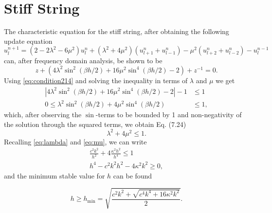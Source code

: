\documentclass{article}
\begin{document}
\section{Stiff String}
The characteristic equation for the stiff string, after obtaining the following update equation
\begin{equation}
    u_l^{n+1}=(2-2\lambda^2-6\mu^2)u_l^n+(\lambda^2+4\mu^2)(u_{l+1}^n+u_{l-1}^n)-\mu^2(u_{l+2}^n+u_{l-2}^n)-u_l^{n-1}
\end{equation}
can, after frequency domain analysis, be shown to be
\begin{equation}
    z + (4\lambda^2\sin^2(\beta h/2)+16\mu^2\sin^4(\beta h/2)-2) +z^{-1} = 0.
\end{equation}
Using \eqref{eq:condition214} and solving the inequality in terms of $\lambda$ and $\mu$ we get
\begin{equation}\label{eq:stiffStringInequality}
    \begin{aligned}
    |4\lambda^2\sin^2(\beta h/2)+16\mu^2\sin^4(\beta h/2)-2|-1&\leq 1\\
    0\leq\lambda^2\sin^2(\beta h/2)+4\mu^2\sin^4(\beta h/2)&\leq 1,
    \end{aligned}
\end{equation}
which, after observing the $\sin$-terms to be bounded by 1 and non-negativity of the solution through the squared terms, we obtain Eq. (7.24)
\begin{equation}
    \lambda^2+4\mu^2\leq 1.
\end{equation}
Recalling \eqref{eq:lambda} and \eqref{eq:mu}, we can write
\begin{equation}
    \begin{aligned}
        \frac{c^2k^2}{h^2} + 4 \frac{\kappa^2h^2}{h^4}\leq 1\\
        h^4 - c^2k^2h^2-4\kappa^2k^2 \geq 0,
    \end{aligned}
\end{equation}
and the minimum stable value for $h$ can be found

\begin{equation}
    h \geq h_\text{min} = \sqrt{\frac{c^2k^2+\sqrt{c^4k^4+16\kappa^2k^2}}{2}}.
\end{equation}
\end{document}
